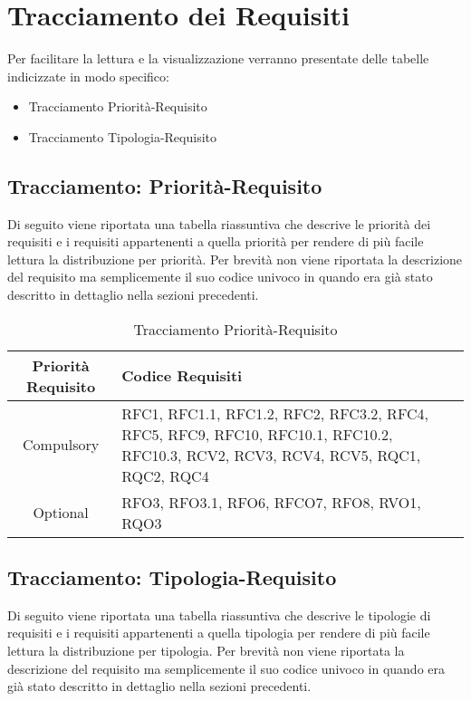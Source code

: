
\section{Tracciamento dei Requisiti}
Per facilitare la lettura e la visualizzazione verranno presentate delle tabelle indicizzate in modo specifico:
\begin{itemize}
    \item Tracciamento Priorità-Requisito
    \item Tracciamento Tipologia-Requisito
\end{itemize}

\newpage
\subsection{Tracciamento: Priorità-Requisito}
Di seguito viene riportata una tabella riassuntiva che descrive le priorità dei requisiti e i requisiti appartenenti a quella priorità per rendere di più facile lettura la distribuzione per priorità.
Per brevità non viene riportata la descrizione del requisito ma semplicemente il suo codice univoco in quando era già stato descritto in dettaglio nella sezioni precedenti.   

\begin{table}[h!] %
            \centering
            \renewcommand{\arraystretch}{2} %
            \begin{tabular}{|c|p{2cm}|} %
                \rowcolor{orange!50} %
        		\hline
        		\textbf{Priorità Requisito} & \textbf{Codice Requisiti} \\
                \hline
                Compulsory & RFC1, RFC1.1, RFC1.2, RFC2, RFC3.2, RFC4, RFC5, RFC9, RFC10, RFC10.1, RFC10.2, RFC10.3, RCV2, RCV3, RCV4, RCV5, RQC1, RQC2, RQC4\\
                \hline
                Optional & RFO3, RFO3.1, RFO6, RFCO7, RFO8, RVO1, RQO3\\
                \hline
        \end{tabular}
        \caption{Tracciamento Priorità-Requisito} %
        \label{tab:Tracciamento Priorità-Requisito}
\end{table}

\newpage
\subsection{Tracciamento: Tipologia-Requisito}
Di seguito viene riportata una tabella riassuntiva che descrive le tipologie di requisiti e i requisiti appartenenti a quella tipologia per rendere di più facile lettura la distribuzione per tipologia.
Per brevità non viene riportata la descrizione del requisito ma semplicemente il suo codice univoco in quando era già stato descritto in dettaglio nella sezioni precedenti.

